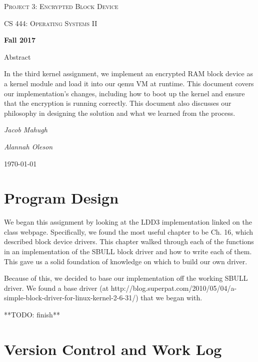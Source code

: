 \documentclass[letterpaper,10pt,titlepage]{article}
\begin{document}
\begin{titlepage}
	\centering
	\vspace*{4cm}
	{\scshape\huge Project 3: Encrypted Block Device\par}
	\vspace{1cm}
	{\scshape\LARGE CS 444: Operating Systems II\par}
	\vspace{0.5cm}
	{\large\bfseries Fall 2017\par}
	{\large Abstract\par}
	\vspace {0.5cm}
	In the third kernel assignment, we implement an encrypted RAM block device
	as a kernel module and load it into our qemu VM at runtime.
	This document covers our implementation's changes,
	including how to boot up the kernel and ensure that the encryption is running
	correctly. This document also discusses our philosophy
	in designing the solution and what we learned from the process.
	\par
	\vspace{1cm}
	{\Large\itshape Jacob Mahugh\par}
    \vspace {0.5cm}
    {\Large\itshape Alannah Oleson\par}
	\vfill
	{\large \today\par}	
\end{titlepage}



\section{Program Design}
We began this assignment by looking at the LDD3 implementation linked on the class webpage.
Specifically, we found the most useful chapter to be Ch. 16, which described block device drivers. 
This chapter walked through each of the functions in an implementation of the SBULL block driver and how to write each of them. 
This gave us a solid foundation of knowledge on which to build our own driver.

Because of this, we decided to base our implementation off the working SBULL driver.
We found a base driver (at http://blog.superpat.com/2010/05/04/a-simple-block-driver-for-linux-kernel-2-6-31/) that we began with.

**TODO: finish**



\section{Version Control and Work Log}
\end{document}
